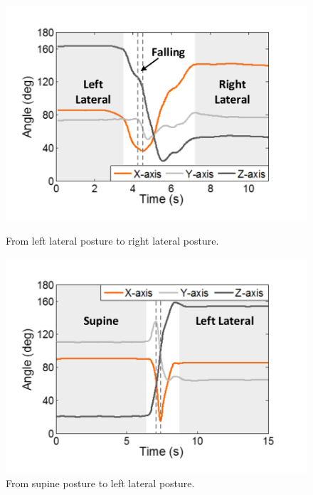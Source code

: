 \begin{figure}[!t]
\begin{minipage}[t]{0.31\linewidth}\centering
    \includegraphics[width=0.97\linewidth]{Figures/LeftToRight.pdf}\centering
  \caption{From left lateral posture to right lateral posture.}\label{fig:LeftToRight}
\end{minipage}
\hspace{2pt}
\begin{minipage}[t]{0.31\linewidth}\centering
    \includegraphics[width=0.97\linewidth]{Figures/SupineToLeft.pdf}\centering
  \caption{From supine posture to left lateral posture.}\label{fig:SupineToLeft}
\end{minipage}
\hspace{2pt}
\begin{minipage}[t]{0.31\linewidth}\centering

\end{minipage}
\end{figure}
